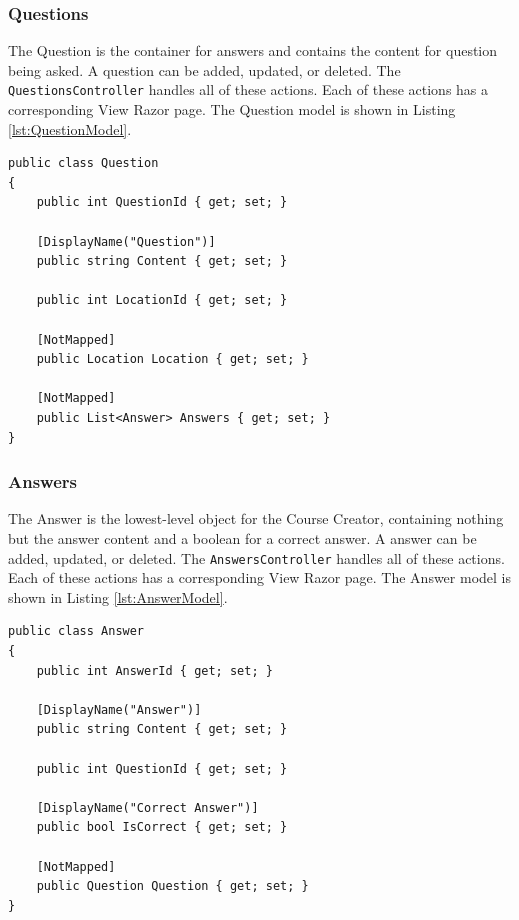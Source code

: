 \subsubsection{Questions}
The Question is the container for answers and contains the content for question being asked. A question can be added, updated, or deleted. The \lstinline{QuestionsController} handles all of these actions. Each of these actions has a corresponding View Razor page. The Question model is shown in Listing \ref{lst:QuestionModel}.
\begin{lstlisting}[caption=Question Model, label=lst:QuestionModel]
public class Question
{
	public int QuestionId { get; set; }
	
	[DisplayName("Question")]
	public string Content { get; set; }
	
	public int LocationId { get; set; }
	
	[NotMapped]
	public Location Location { get; set; }
	
	[NotMapped]
	public List<Answer> Answers { get; set; }
}
\end{lstlisting}

\subsubsection{Answers}
The Answer is the lowest-level object for the Course Creator, containing nothing but the answer content and a boolean for a correct answer.  A answer can be added, updated, or deleted. The \lstinline{AnswersController} handles all of these actions. Each of these actions has a corresponding View Razor page. The Answer model is shown in Listing \ref{lst:AnswerModel}.
\begin{lstlisting}[caption=Answer Model, label=lst:AnswerModel]
public class Answer
{
	public int AnswerId { get; set; }
	
	[DisplayName("Answer")]
	public string Content { get; set; }
	
	public int QuestionId { get; set; }
	
	[DisplayName("Correct Answer")]
	public bool IsCorrect { get; set; }
	
	[NotMapped]
	public Question Question { get; set; }
}
\end{lstlisting}

